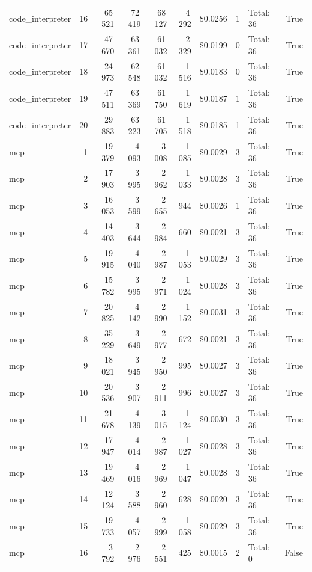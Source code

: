 \documentclass[a4paper,11pt]{article}
\begin{document}
\begin{table}[H]
{\begin{tabular}{l r r r r r r r l r}
code\_interpreter & 16 & 65\,521 & 72\,419 & 68\,127 & 4\,292 & \$0.0256 & 1 & Total: 36 & True \\
code\_interpreter & 17 & 47\,670 & 63\,361 & 61\,032 & 2\,329 & \$0.0199 & 0 & Total: 36 & True \\
code\_interpreter & 18 & 24\,973 & 62\,548 & 61\,032 & 1\,516 & \$0.0183 & 0 & Total: 36 & True \\
code\_interpreter & 19 & 47\,511 & 63\,369 & 61\,750 & 1\,619 & \$0.0187 & 1 & Total: 36 & True \\
code\_interpreter & 20 & 29\,883 & 63\,223 & 61\,705 & 1\,518 & \$0.0185 & 1 & Total: 36 & True \\
\midrule
mcp & 1 & 19\,379 & 4\,093 & 3\,008 & 1\,085 & \$0.0029 & 3 & Total: 36 & True \\
mcp & 2 & 17\,903 & 3\,995 & 2\,962 & 1\,033 & \$0.0028 & 3 & Total: 36 & True \\
mcp & 3 & 16\,053 & 3\,599 & 2\,655 & 944 & \$0.0026 & 1 & Total: 36 & True \\
mcp & 4 & 14\,403 & 3\,644 & 2\,984 & 660 & \$0.0021 & 3 & Total: 36 & True \\
mcp & 5 & 19\,915 & 4\,040 & 2\,987 & 1\,053 & \$0.0029 & 3 & Total: 36 & True \\
mcp & 6 & 15\,782 & 3\,995 & 2\,971 & 1\,024 & \$0.0028 & 3 & Total: 36 & True \\
mcp & 7 & 20\,825 & 4\,142 & 2\,990 & 1\,152 & \$0.0031 & 3 & Total: 36 & True \\
mcp & 8 & 35\,229 & 3\,649 & 2\,977 & 672 & \$0.0021 & 3 & Total: 36 & True \\
mcp & 9 & 18\,021 & 3\,945 & 2\,950 & 995 & \$0.0027 & 3 & Total: 36 & True \\
mcp & 10 & 20\,536 & 3\,907 & 2\,911 & 996 & \$0.0027 & 3 & Total: 36 & True \\
mcp & 11 & 21\,678 & 4\,139 & 3\,015 & 1\,124 & \$0.0030 & 3 & Total: 36 & True \\
mcp & 12 & 17\,947 & 4\,014 & 2\,987 & 1\,027 & \$0.0028 & 3 & Total: 36 & True \\
mcp & 13 & 19\,469 & 4\,016 & 2\,969 & 1\,047 & \$0.0028 & 3 & Total: 36 & True \\
mcp & 14 & 12\,124 & 3\,588 & 2\,960 & 628 & \$0.0020 & 3 & Total: 36 & True \\
mcp & 15 & 19\,733 & 4\,057 & 2\,999 & 1\,058 & \$0.0029 & 3 & Total: 36 & True \\
mcp & 16 & 3\,792 & 2\,976 & 2\,551 & 425 & \$0.0015 & 2 & Total: 0 & False \\

\end{tabular}}
\end{table}
\end{document}
